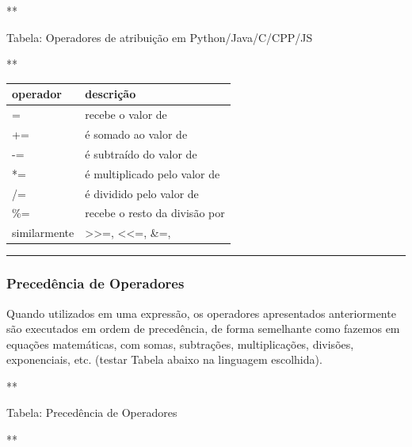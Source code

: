 \documentclass[12pt,a4paper]{article}
\begin{document}
    **

Tabela: Operadores de atribuição em Python/Java/C/CPP/JS

**

\begin{longtable}[]{@{}ll@{}}
\toprule()
operador & descrição \\
\midrule()
\endhead
= & recebe o valor de \\
+= & é somado ao valor de \\
-= & é subtraído do valor de \\
*= & é multiplicado pelo valor de \\
/= & é dividido pelo valor de \\
\%= & recebe o resto da divisão por \\
similarmente & \textgreater\textgreater=, \textless\textless=, \&=, \\
\bottomrule()
\end{longtable}

    \begin{center}\rule{0.5\linewidth}{0.5pt}\end{center}

    \hypertarget{preceduxeancia-de-operadores}{%
\subsubsection{Precedência de
Operadores}\label{preceduxeancia-de-operadores}}

    Quando utilizados em uma expressão, os operadores apresentados
anteriormente são executados em ordem de precedência, de forma
semelhante como fazemos em equações matemáticas, com somas, subtrações,
multiplicações, divisões, exponenciais, etc. (testar Tabela abaixo na
linguagem escolhida).

    **

Tabela: Precedência de Operadores

**
\end{document}

